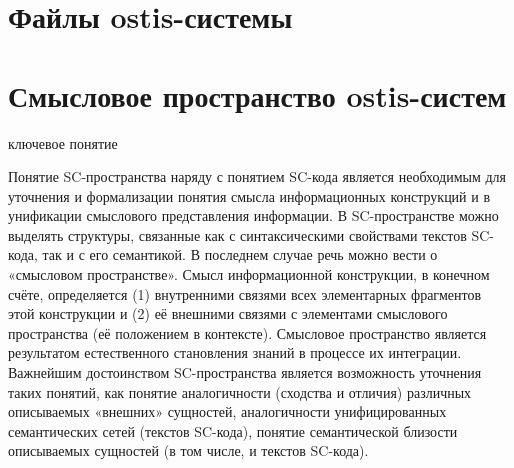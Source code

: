 \section{Файлы ostis-системы}
\label{sec_sr_ostisfiles}
\section{Смысловое пространство ostis-систем}
\label{sec_sr_semspace}
\begin{SCn}
	\begin{scnrelfromlist}{ключевое понятие}
	\end{scnrelfromlist}
\end{SCn}

Понятие SC-пространства наряду с понятием SC-кода является необходимым для уточнения и формализации понятия смысла информационных конструкций и в унификации смыслового представления информации. В SC-пространстве можно выделять структуры, связанные как с синтаксическими свойствами текстов SC-кода, так и с его семантикой. В последнем случае речь можно вести о «смысловом пространстве». Смысл информационной конструкции, в конечном счёте, определяется (1) внутренними связями всех элементарных фрагментов этой конструкции и (2) её внешними связями с элементами смыслового пространства (её положением в контексте). Смысловое пространство является результатом естественного становления знаний в процессе их интеграции.
Важнейшим достоинством SC-пространства является возможность уточнения таких понятий, как понятие аналогичности (сходства и отличия) различных описываемых «внешних» сущностей, аналогичности унифицированных семантических сетей (текстов SC-кода), понятие семантической близости описываемых сущностей (в том числе, и текстов SC-кода).

